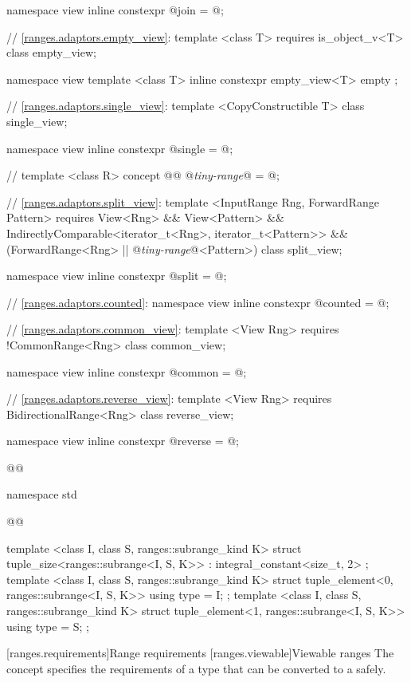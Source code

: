 \begin{codeblock}
{{  namespace view { inline constexpr @\unspec@ join = @\unspec@; }

  // \ref{ranges.adaptors.empty_view}:
  template <class T>
    requires is_object_v<T>
  class empty_view;

  namespace view {
    template <class T>
    inline constexpr empty_view<T> empty {};
  }

  // \ref{ranges.adaptors.single_view}:
  template <CopyConstructible T>
  class single_view;

  namespace view { inline constexpr @\unspec@ single = @\unspec@; }

  // \expos
  template <class R>
  concept @@ @\textit{tiny-range}@ = @\seebelow@;

  // \ref{ranges.adaptors.split_view}:
  template <InputRange Rng, ForwardRange Pattern>
    requires View<Rng> && View<Pattern> &&
        IndirectlyComparable<iterator_t<Rng>, iterator_t<Pattern>> &&
        (ForwardRange<Rng> || @\textit{tiny-range}@<Pattern>)
  class split_view;

  namespace view { inline constexpr @\unspec@ split = @\unspec@; }

  // \ref{ranges.adaptors.counted}:
  namespace view { inline constexpr @\unspec@ counted = @\unspec@; }

  // \ref{ranges.adaptors.common_view}:
  template <View Rng>
    requires !CommonRange<Rng>
  class common_view;

  namespace view { inline constexpr @\unspec@ common = @\unspec@; }

  // \ref{ranges.adaptors.reverse_view}:
  template <View Rng>
    requires BidirectionalRange<Rng>
  class reverse_view;

  namespace view { inline constexpr @\unspec@ reverse = @\unspec@; }
}}@\removed{\}\}}@

namespace std {
  @@

  template <class I, class S, ranges::subrange_kind K>
    struct tuple_size<ranges::subrange<I, S, K>>
      : integral_constant<size_t, 2> {};
  template <class I, class S, ranges::subrange_kind K>
    struct tuple_element<0, ranges::subrange<I, S, K>> {
      using type = I;
    };
  template <class I, class S, ranges::subrange_kind K>
    struct tuple_element<1, ranges::subrange<I, S, K>> {
      using type = S;
    };
}
\end{codeblock}

\setcounter{section}{6}
[ranges.requirements]{Range requirements}
\setcounter{subsection}{10}
[ranges.viewable]{Viewable ranges}
\pnum The  concept specifies the requirements of a 
type that can be converted to a  safely.

